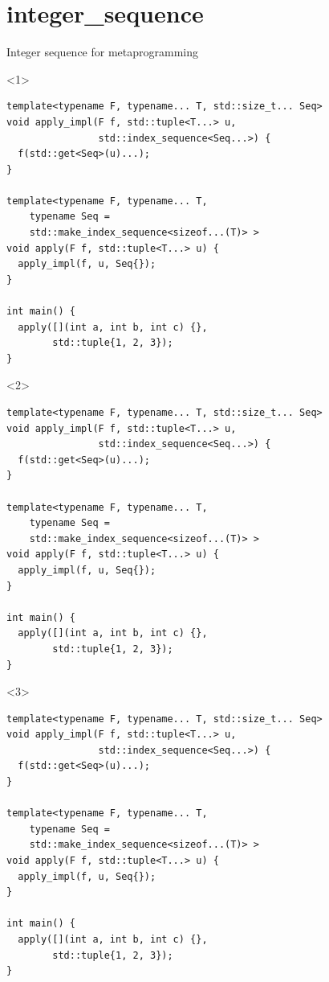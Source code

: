 \documentclass[10pt]{beamer}
\begin{document}
\section{integer\_sequence}
\begin{frame}[fragile]{Integer sequence for metaprogramming}

	\vfill

\begin{onlyenv}<1>
	\begin{verbatim}
template<typename F, typename... T, std::size_t... Seq>
void apply_impl(F f, std::tuple<T...> u,
                std::index_sequence<Seq...>) {
  f(std::get<Seq>(u)...);
}

template<typename F, typename... T,
    typename Seq =
    std::make_index_sequence<sizeof...(T)> >
void apply(F f, std::tuple<T...> u) {
  apply_impl(f, u, Seq{});
}

int main() {
  apply([](int a, int b, int c) {},
        std::tuple{1, 2, 3});
}
	\end{verbatim}
\end{onlyenv}

\begin{onlyenv}<2>
	\begin{verbatim}
template<typename F, typename... T, std::size_t... Seq>
void apply_impl(F f, std::tuple<T...> u,
                std::index_sequence<Seq...>) {
  f(std::get<Seq>(u)...);
}

template<typename F, typename... T,
    typename Seq =
    std::make_index_sequence<sizeof...(T)> >
void apply(F f, std::tuple<T...> u) {
  apply_impl(f, u, Seq{});
}

int main() {
  apply([](int a, int b, int c) {},
        std::tuple{1, 2, 3});
}
	\end{verbatim}
\end{onlyenv}

\begin{onlyenv}<3>
	\begin{verbatim}
template<typename F, typename... T, std::size_t... Seq>
void apply_impl(F f, std::tuple<T...> u,
                std::index_sequence<Seq...>) {
  f(std::get<Seq>(u)...);
}

template<typename F, typename... T,
    typename Seq =
    std::make_index_sequence<sizeof...(T)> >
void apply(F f, std::tuple<T...> u) {
  apply_impl(f, u, Seq{});
}

int main() {
  apply([](int a, int b, int c) {},
        std::tuple{1, 2, 3});
}
	\end{verbatim}
\end{onlyenv}


\end{frame}
\end{document}

